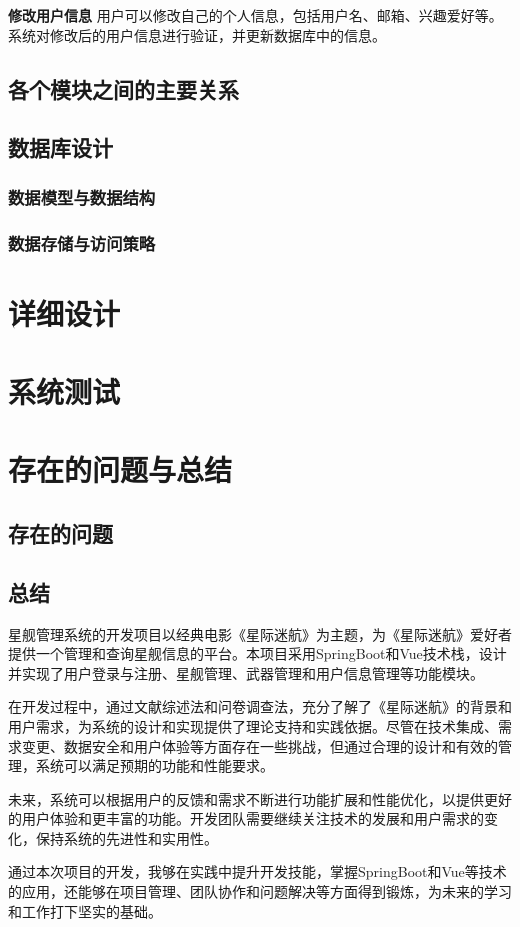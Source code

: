 \documentclass{base}
\begin{document}
\textbf{修改用户信息} 用户可以修改自己的个人信息，包括用户名、邮箱、兴趣爱好等。系统对修改后的用户信息进行验证，并更新数据库中的信息。

\subsection{各个模块之间的主要关系}

\subsection{数据库设计}

\subsubsection{数据模型与数据结构}

\subsubsection{数据存储与访问策略}

\section{详细设计}

\section{系统测试}

\section{存在的问题与总结}

\subsection{存在的问题}

\subsection{总结}

星舰管理系统的开发项目以经典电影《星际迷航》为主题，为《星际迷航》爱好者提供一个管理和查询星舰信息的平台。本项目采用SpringBoot和Vue技术栈，设计并实现了用户登录与注册、星舰管理、武器管理和用户信息管理等功能模块。

在开发过程中，通过文献综述法和问卷调查法，充分了解了《星际迷航》的背景和用户需求，为系统的设计和实现提供了理论支持和实践依据。尽管在技术集成、需求变更、数据安全和用户体验等方面存在一些挑战，但通过合理的设计和有效的管理，系统可以满足预期的功能和性能要求。

未来，系统可以根据用户的反馈和需求不断进行功能扩展和性能优化，以提供更好的用户体验和更丰富的功能。开发团队需要继续关注技术的发展和用户需求的变化，保持系统的先进性和实用性。

通过本次项目的开发，我够在实践中提升开发技能，掌握SpringBoot和Vue等技术的应用，还能够在项目管理、团队协作和问题解决等方面得到锻炼，为未来的学习和工作打下坚实的基础。
\end{document}
